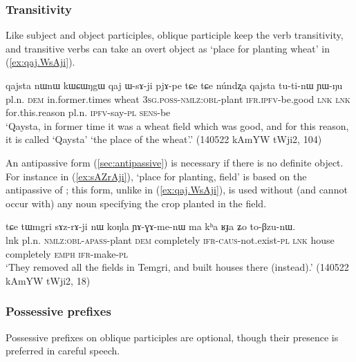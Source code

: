 \subsubsection{Transitivity} \label{sec:oblique.participle.transitivity}
Like subject and object participles, oblique participle keep the verb transitivity, and transitive verbs can take an overt object as  `place for planting wheat' in (\ref{ex:qaj.WsAji}).

\begin{exe}
\ex \label{ex:qaj.WsAji}
\gll  qajsta nɯnɯ kɯɕɯŋgɯ qaj ɯ-sɤ-ji pjɤ-pe tɕe tɕe núndʐa qajsta tu-ti-nɯ ɲɯ-ŋu \\
pl.n. \textsc{dem} in.former.times wheat \textsc{3sg}.\textsc{poss}-\textsc{nmlz}:\textsc{obl}-plant \textsc{ifr}.\textsc{ipfv}-be.good \textsc{lnk} \textsc{lnk} for.this.reason pl.n. \textsc{ipfv}-say-\textsc{pl} \textsc{sens}-be \\
\glt `Qaysta, in former time it was a wheat field which was good, and for this reason, it is called `Qaysta' `the place of the wheat'.' (140522 kAmYW tWji2, 104)
\end{exe}

An antipassive form (\ref{sec:antipassive}) is necessary if there is no definite object. For instance in (\ref{ex:sAZrAji}),  `place for planting, field' is based on the  antipassive of ; this form, unlike  in (\ref{ex:qaj.WsAji}), is used without (and cannot occur with) any noun specifying the crop planted in the field.

\begin{exe}
\ex \label{ex:sAZrAji}
\gll  tɕe tɯmgri sɤz-rɤ-ji nɯ koŋla ɲɤ-ɣɤ-me-nɯ ma kʰa ʁɟa ʑo to-βzu-nɯ. \\
lnk pl.n. \textsc{nmlz}:\textsc{obl}-\textsc{apass}-plant \textsc{dem} completely \textsc{ifr}-\textsc{caus}-not.exist-\textsc{pl} \textsc{lnk} house completely \textsc{emph} \textsc{ifr}-make-\textsc{pl} \\
\glt `They removed all the fields in Temgri, and built houses there (instead).' (140522 kAmYW tWji2, 18)
\end{exe}

 \subsubsection{Possessive prefixes} \label{sec:oblique.participle.possessive}
Possessive prefixes on oblique participles are optional, though their presence is preferred in careful speech.

